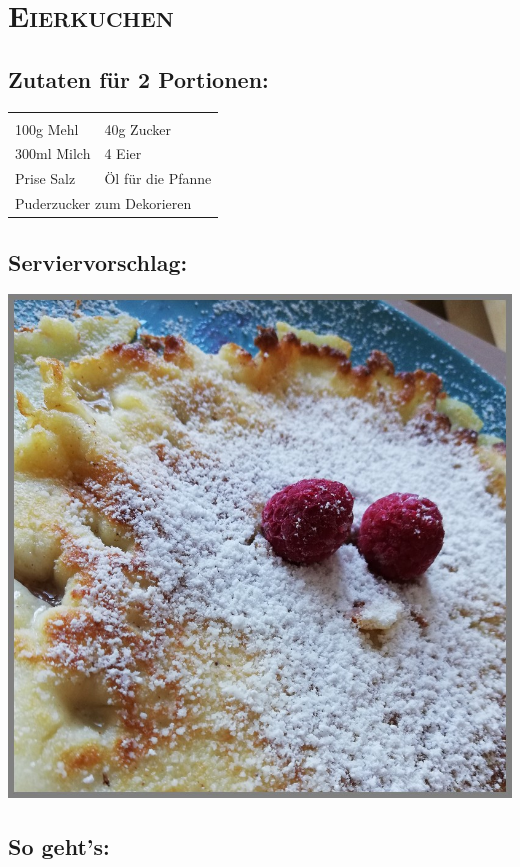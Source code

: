 \section{\textsc{Eierkuchen}}

\subsection*{Zutaten für 2 Portionen:}

\begin{tabular}{p{7.5cm} p{7.5cm}}
	& \\
	100g Mehl & 40g Zucker \\
	300ml Milch & 4 Eier \\
	Prise Salz & Öl für die Pfanne \\
	\multicolumn{2}{l}{Puderzucker zum Dekorieren}
\end{tabular}

\subsection*{Serviervorschlag:}

\includegraphics[width=\textwidth]{img/pancakes.jpg} \cite{pancakes}

\subsection*{So geht's:}


